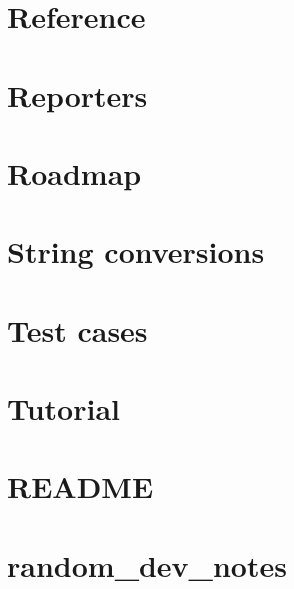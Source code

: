 \let\mypdfximage\pdfximage\def\pdfximage{\immediate\mypdfximage}\documentclass[twoside]{book}
\newcommand{\+}{\discretionary{\mbox{\scriptsize$\hookleftarrow$}}{}{}}
\begin{document}
\chapter{Reference}
\label{md_external_doctest_doc_markdown_readme}

\chapter{Reporters}
\label{md_external_doctest_doc_markdown_reporters}

\chapter{Roadmap}
\label{md_external_doctest_doc_markdown_roadmap}

\chapter{String conversions}
\label{md_external_doctest_doc_markdown_stringification}

\chapter{Test cases}
\label{md_external_doctest_doc_markdown_testcases}

\chapter{Tutorial}
\label{md_external_doctest_doc_markdown_tutorial}

\chapter{R\+E\+A\+D\+ME}
\label{md_external_doctest__r_e_a_d_m_e}

\chapter{random\+\_\+dev\+\_\+notes}
\label{md_external_doctest_scripts_random_dev_notes}

\end{document}
